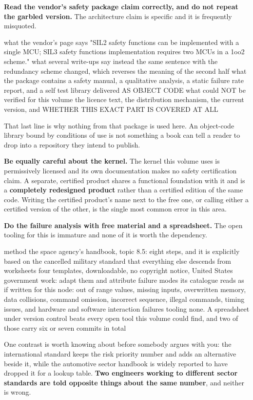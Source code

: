 \begin{steps}
\item \textbf{Read the vendor's safety package claim correctly, and do not
repeat the garbled version.} The architecture claim is specific and it is
frequently misquoted.
\begin{plaincode}
what the vendor's page says
  "SIL2 safety functions can be implemented with a single MCU;
   SIL3 safety functions implementation requires two MCUs in a 1oo2 scheme."
what several write-ups say instead
  the same sentence with the redundancy scheme changed, which reverses the
  meaning of the second half
what the package contains
  a safety manual, a qualitative analysis, a static failure rate report,
  and a self test library delivered AS OBJECT CODE
what could NOT be verified for this volume
  the licence text, the distribution mechanism, the current version, and
  WHETHER THIS EXACT PART IS COVERED AT ALL
\end{plaincode}
That last line is why nothing from that package is used here. An object-code
library bound by conditions of use is not something a book can tell a reader to
drop into a repository they intend to publish.

\item \textbf{Be equally careful about the kernel.} The kernel this volume uses
is permissively licensed and its own documentation makes no safety certification
claim. A separate, certified product shares a functional foundation with it and
is a \textbf{completely redesigned product} rather than a certified edition of
the same code. Writing the certified product's name next to the free one, or
calling either a certified version of the other, is the single most common
error in this area.

\item \textbf{Do the failure analysis with free material and a spreadsheet.} The
open tooling for this is immature and none of it is worth the dependency.
\begin{plaincode}
method        the space agency's handbook, topic 8.5: eight steps, and it is
              explicitly based on the cancelled military standard that
              everything else descends from
worksheets    four templates, downloadable, no copyright notice, United
              States government work: adapt them and attribute
failure modes its catalogue reads as if written for this node: out of range
              values, missing inputs, overwritten memory, data collisions,
              command omission, incorrect sequence, illegal commands,
              timing issues, and hardware and software interaction failures
tooling       none. A spreadsheet under version control beats every open
              tool this volume could find, and two of those carry six or
              seven commits in total
\end{plaincode}
One contrast is worth knowing about before somebody argues with you: the
international standard keeps the risk priority number and adds an alternative
beside it, while the automotive sector handbook is widely reported to have
dropped it for a lookup table. \textbf{Two engineers working to different sector
standards are told opposite things about the same number}, and neither is wrong.


\end{steps}
